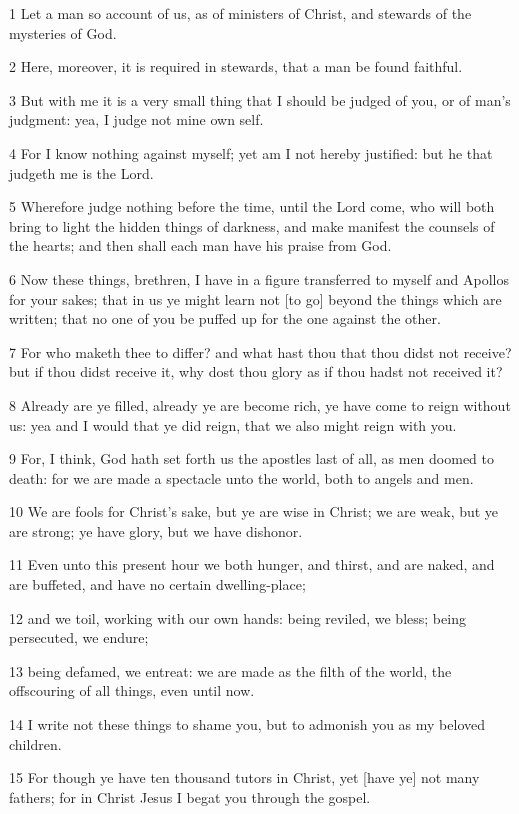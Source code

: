 \par 1 Let a man so account of us, as of ministers of Christ, and stewards of the mysteries of God.
\par 2 Here, moreover, it is required in stewards, that a man be found faithful.
\par 3 But with me it is a very small thing that I should be judged of you, or of man's judgment: yea, I judge not mine own self.
\par 4 For I know nothing against myself; yet am I not hereby justified: but he that judgeth me is the Lord.
\par 5 Wherefore judge nothing before the time, until the Lord come, who will both bring to light the hidden things of darkness, and make manifest the counsels of the hearts; and then shall each man have his praise from God.
\par 6 Now these things, brethren, I have in a figure transferred to myself and Apollos for your sakes; that in us ye might learn not [to go] beyond the things which are written; that no one of you be puffed up for the one against the other.
\par 7 For who maketh thee to differ? and what hast thou that thou didst not receive? but if thou didst receive it, why dost thou glory as if thou hadst not received it?
\par 8 Already are ye filled, already ye are become rich, ye have come to reign without us: yea and I would that ye did reign, that we also might reign with you.
\par 9 For, I think, God hath set forth us the apostles last of all, as men doomed to death: for we are made a spectacle unto the world, both to angels and men.
\par 10 We are fools for Christ's sake, but ye are wise in Christ; we are weak, but ye are strong; ye have glory, but we have dishonor.
\par 11 Even unto this present hour we both hunger, and thirst, and are naked, and are buffeted, and have no certain dwelling-place;
\par 12 and we toil, working with our own hands: being reviled, we bless; being persecuted, we endure;
\par 13 being defamed, we entreat: we are made as the filth of the world, the offscouring of all things, even until now.
\par 14 I write not these things to shame you, but to admonish you as my beloved children.
\par 15 For though ye have ten thousand tutors in Christ, yet [have ye] not many fathers; for in Christ Jesus I begat you through the gospel.
